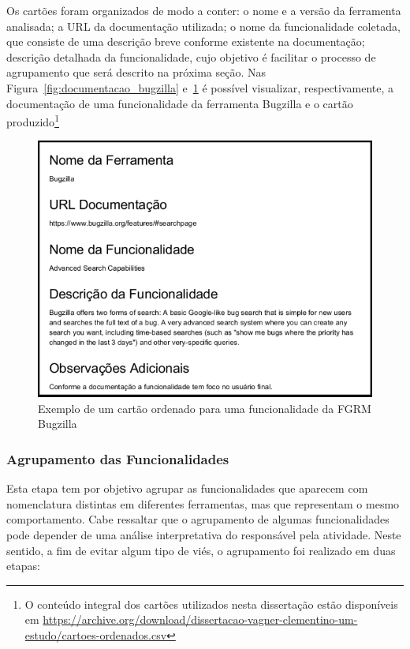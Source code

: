 Os cartões foram organizados de modo a conter: o nome e a versão da ferramenta
analisada; a URL da documentação utilizada; o nome da funcionalidade coletada,
que consiste de uma descrição breve conforme existente na documentação;
descrição detalhada da funcionalidade, cujo objetivo é facilitar o processo de
agrupamento que será descrito na próxima seção. Nas
Figura~\ref{fig:documentacao_bugzilla} e~\ref{fig:exemplo_cartao_ordenado} é
possível visualizar, respectivamente, a documentação de uma funcionalidade da
ferramenta Bugzilla e o cartão produzido\footnote{O conteúdo integral dos
    cartões utilizados nesta dissertação estão disponíveis em
    \url{https://archive.org/download/dissertacao-vagner-clementino-um-estudo/cartoes-ordenados.csv}}

\begin{figure}[htpb]
	\centering
	\includegraphics[width=0.9\linewidth]{./chapter-estudo-funcionalidades-fgrm/img/exemplo_cartao_ordenado.png}
	\caption{Exemplo de um cartão ordenado para uma funcionalidade da FGRM
		Bugzilla}\label{fig:exemplo_cartao_ordenado}
\end{figure}

\subsubsection{Agrupamento das Funcionalidades}\label{subsec:agrupamento_fucionalidades}

Esta etapa tem por objetivo agrupar as funcionalidades que aparecem com
nomenclatura distintas em diferentes ferramentas, mas que representam o mesmo
comportamento. Cabe ressaltar que o agrupamento de algumas funcionalidades pode
depender de uma análise interpretativa do responsável pela atividade. Neste
sentido, a fim de evitar algum tipo de viés, o agrupamento foi realizado em
duas etapas:

